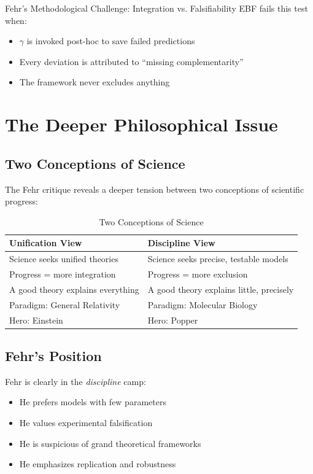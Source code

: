\begin{chapter}{Fehr's Methodological Challenge: Integration vs. Falsifiability}
EBF fails this test when:
\begin{itemize}[noitemsep]
    \item $\gamma$ is invoked post-hoc to save failed predictions
    \item Every deviation is attributed to ``missing complementarity''
    \item The framework never excludes anything
\end{itemize}


\section{The Deeper Philosophical Issue}
\label{sec:philosophy}

\subsection{Two Conceptions of Science}

The Fehr critique reveals a deeper tension between two conceptions of scientific progress:

\begin{table}[h]
\centering
\caption{Two Conceptions of Science}
\label{tab:two-conceptions}
\renewcommand{\arraystretch}{1.4}
\begin{tabular}{@{}p{6cm}p{6cm}@{}}
\toprule
\textbf{Unification View} & \textbf{Discipline View} \\
\midrule
Science seeks unified theories & Science seeks precise, testable models \\
Progress = more integration & Progress = more exclusion \\
A good theory explains everything & A good theory explains little, precisely \\
Paradigm: General Relativity & Paradigm: Molecular Biology \\
Hero: Einstein & Hero: Popper \\
\bottomrule
\end{tabular}
\end{table}

\subsection{Fehr's Position}

Fehr is clearly in the \textit{discipline} camp:
\begin{itemize}[noitemsep]
    \item He prefers models with few parameters
    \item He values experimental falsification
    \item He is suspicious of grand theoretical frameworks
    \item He emphasizes replication and robustness
\end{itemize}


\end{chapter}
